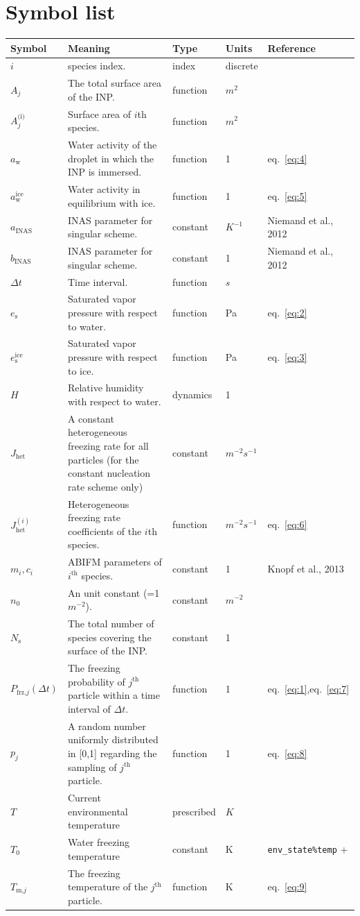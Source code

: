 \documentclass{article}
\begin{document}
\section{Symbol list}
\label{sec:symbol-list}

\newcommand{\rr}{\raggedright}
\newcommand{\tn}{\tabularnewline\hline}
\renewcommand{\arraystretch}{1.5}
\begin{longtable}{|l|p{5.5cm}|l|l|p{4.5cm}|}
\hline \textbf{Symbol} & \textbf{Meaning}                                                       & \textbf{Type} & \textbf{Units}                        &  \textbf{Reference}                                \tn
\hline \endhead
\(i\) & species index. & index & discrete & \tn
\( A_j \) & The total surface area of the INP. & function & $m^2$ & \tn
\( A_j^\text{(i)} \) & Surface area of \( i \)th species. & function & $m^2$ & \tn
\( a_{\text{w}} \) & Water activity of the droplet in which the INP is immersed. & function & 1 & eq.~\ref{eq:4}\tn
\( a_\text{w}^\text{ice} \) & Water activity in equilibrium with ice.  & function & 1 & eq.~\ref{eq:5} \tn
\(a_\text{INAS}\) & INAS parameter for singular scheme. & constant & $K^{-1}$ & Niemand et al., 2012 \tn
\(b_\text{INAS}\) & INAS parameter for singular scheme. & constant & 1 & Niemand et al., 2012 \tn
\( \Delta t \) & Time interval.  & function & $s$ & \tn
\( e_\text{s} \) & Saturated vapor pressure with respect to water. & function & Pa & eq.~\ref{eq:2} \tn
\( e_\text{s}^\text{ice} \) & Saturated vapor pressure with respect to ice. & function & Pa & eq.~\ref{eq:3} \tn
\( H \) & Relative humidity with respect to water. & dynamics & 1 & \tn
\( J_{\text{het}} \) & A constant heterogeneous freezing rate for all particles (for the constant nucleation rate scheme only) & constant &  $m^{-2}s^{-1}$ & \tn
\( J_{\text{het}}^{(i)} \) & Heterogeneous freezing rate coefficients of the \( i \)th species. & function & $m^{-2}s^{-1}$ & eq.~\ref{eq:6} \tn
\( m_i, c_i \) & ABIFM parameters of \( i^\text{th} \) species. & constant & 1 & Knopf et al., 2013 \tn
\(n_0\) & An unit constant (=1 $m^{-2}$). & constant & $m^{-2}$ & \tn
\( N_\text{s} \) & The total number of species covering the surface of the INP. & constant & 1 & \tn
\( P_{\text{frz,}j} (\Delta t)\) & The freezing probability of $j^\text{th}$ particle within a time interval of $\Delta t$. & function & 1 & eq.~\ref{eq:1},eq.~\ref{eq:7} \tn
\(p_j\) & A random number uniformly distributed in [0,1] regarding the sampling of $j^\text{th}$ particle. & function & 1 & eq.~\ref{eq:8} \tn
\(T\) & Current environmental temperature & prescribed & $K$ & \tn
\(T_0\) & Water freezing temperature & constant & K & \verb+env_state%temp+ \tn
\(T_{\text{m,}j}\) & The freezing temperature of the $j^\text{th}$ particle. & function & K & eq.~\ref{eq:9} \tn

\end{longtable}
\end{document}
